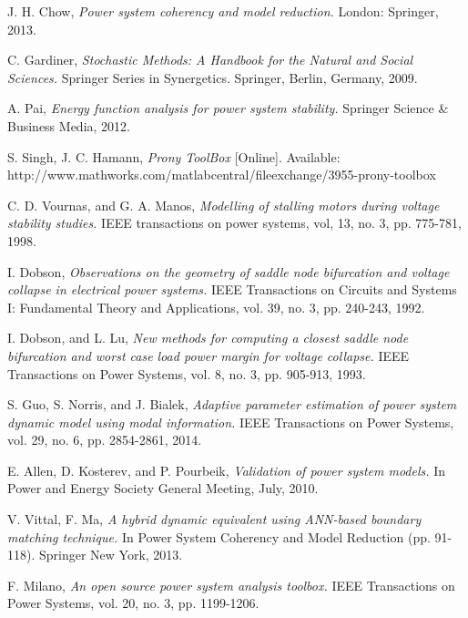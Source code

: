 \documentclass[journal]{IEEEtran}
\begin{document}
\begin{thebibliography}{1}
J. H. Chow, {\em Power system coherency and model reduction.}
\newblock London: Springer, 2013.

















C.  Gardiner, {\em Stochastic Methods: A Handbook for the Natural and Social Sciences.}
\newblock Springer Series in Synergetics. Springer, Berlin, Germany, 2009.

A. Pai, {\em Energy function analysis for power system stability.}
\newblock Springer Science \& Business Media, 2012.


S. Singh, J. C. Hamann, {\em Prony ToolBox} [Online]. Available: http://www.mathworks.com/matlabcentral/fileexchange/3955-prony-toolbox

C. D. Vournas, and G. A. Manos, {\em Modelling of stalling motors during voltage stability studies.}
\newblock IEEE transactions on power systems, vol, 13, no. 3, pp. 775-781, 1998.

I. Dobson, {\em Observations on the geometry of saddle node bifurcation and voltage collapse in electrical power systems.}
\newblock IEEE Transactions on Circuits and Systems I: Fundamental Theory and Applications, vol. 39, no. 3, pp. 240-243, 1992.

I. Dobson, and L. Lu, {\em New methods for computing a closest saddle node bifurcation and worst case load power margin for voltage collapse.} \newblock IEEE Transactions on Power Systems, vol. 8, no. 3, pp. 905-913, 1993.

S. Guo, S. Norris, and J. Bialek, {\em Adaptive parameter estimation of power system dynamic model using modal information.}
\newblock IEEE Transactions on Power Systems, vol. 29, no. 6, pp. 2854-2861, 2014.







E. Allen, D. Kosterev, and P. Pourbeik, {\em Validation of power system models.}
\newblock In Power and Energy Society General Meeting, July, 2010.

V. Vittal, F.  Ma, {\em A hybrid dynamic equivalent using ANN-based boundary matching technique.}
\newblock In Power System Coherency and Model Reduction (pp. 91-118). Springer New York, 2013.

F. Milano, {\em An open source power system analysis toolbox.}
\newblock IEEE Transactions on Power Systems, vol. 20, no. 3, pp. 1199-1206.

\end{thebibliography}
\end{document}
